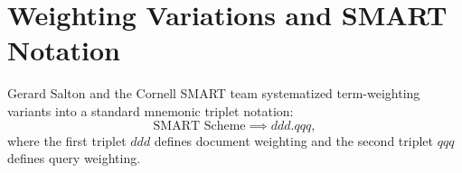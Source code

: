 \FloatBarrier
\section{Weighting Variations and SMART Notation}
\label{sec:smart-notation-en}

Gerard Salton and the Cornell SMART team systematized term-weighting variants into a standard mnemonic triplet notation:
\begin{equation}
\text{SMART Scheme} \implies ddd.qqq,
\end{equation}
where the first triplet $ddd$ defines document weighting and the second triplet $qqq$ defines query weighting.

\begin{table}[H]
\centering
{}
\caption{Systematic taxonomy of weighting components in SMART notation.}
\label{tab:smart-taxonomy-en}
\end{table}

